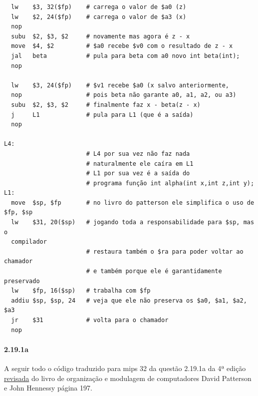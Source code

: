 \documentclass{article}
\begin{document}
\begin{verbatim}
  lw    $3, 32($fp)    # carrega o valor de $a0 (z)
  lw    $2, 24($fp)    # carrega o valor de $a3 (x)
  nop
  subu  $2, $3, $2     # novamente mas agora é z - x
  move  $4, $2         # $a0 recebe $v0 com o resultado de z - x
  jal   beta           # pula para beta com a0 novo int beta(int);
  nop

  lw    $3, 24($fp)    # $v1 recebe $a0 (x salvo anteriormente,
  nop                  # pois beta não garante a0, a1, a2, ou a3)
  subu  $2, $3, $2     # finalmente faz x - beta(z - x)
  j     L1             # pula para L1 (que é a saída)
  nop

L4:
                       # L4 por sua vez não faz nada
                       # naturalmente ele caíra em L1
                       # L1 por sua vez é a saída do
                       # programa função int alpha(int x,int z,int y);
L1:
  move  $sp, $fp       # no livro do patterson ele simplifica o uso de $fp, $sp
  lw    $31, 20($sp)   # jogando toda a responsabilidade para $sp, mas o
  compilador
                       # restaura também o $ra para poder voltar ao chamador
                       # e também porque ele é garantidamente preservado
  lw    $fp, 16($sp)   # trabalha com $fp
  addiu $sp, $sp, 24   # veja que ele não preserva os $a0, $a1, $a2, $a3
  jr    $31            # volta para o chamador
  nop
\end{verbatim}

\pagebreak
\paragraph{2.19.1a}

A seguir todo o código traduzido para mips 32 da questão 2.19.1a da 4ª edição
\underline{revisada} do livro de organização e modulagem de computadores David
Patterson e John Hennessy página 197.
\end{document}

